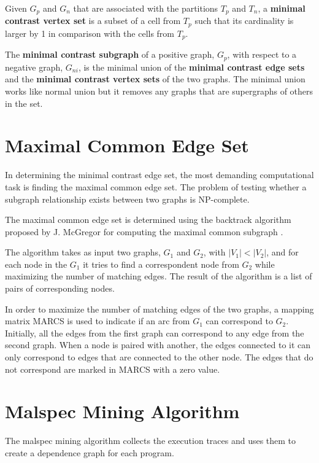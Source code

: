 Given $G_{p}$ and $G_{n}$ that are associated with the partitions $T_{p}$ and $T_{n}$, a \textbf{minimal contrast vertex set} is a subset of a cell from $T_{p}$ such that its cardinality is larger by 1 in comparison with the cells from $T_{p}$.

The \textbf{minimal contrast subgraph} of a positive graph, $G_{p}$, with respect to a negative graph, $G_{ni}$, is the minimal union of the \textbf{minimal contrast edge sets} and the \textbf{minimal contrast vertex sets} of the two graphs. The minimal union works like normal union but it removes any graphs that are supergraphs of others in the set.

\section{Maximal Common Edge Set}
\label{third:maximal-common-edge-set}

In determining the minimal contrast edge set, the most demanding computational task is finding the maximal common edge set. The problem of testing whether a subgraph relationship exists between two graphs is NP-complete.

The maximal common edge set is determined using the backtrack algorithm proposed by J. McGregor for computing the maximal common subgraph \cite{common-subgraph}. 

The algorithm takes as input two graphs, $G_{1}$ and $G_{2}$, with $|V_{1}| < |V_{2}|$, and for each node in the $G_{1}$ it tries to find a correspondent node from $G_{2}$ while maximizing the number of matching edges. The result of the algorithm is a list of pairs of corresponding nodes.

In order to maximize the number of matching edges of the two graphs, a mapping matrix MARCS is used to indicate if an arc from $G_{1}$ can correspond to $G_{2}$. Initially, all the edges from the first graph can correspond to any edge from the second graph. When a node is paired with another, the edges connected to it can only correspond to edges that are connected to the other node. The edges that do not correspond are marked in MARCS with a zero value.

\section{Malspec Mining Algorithm}
\label{third:malspec-algorithm}	

The malspec mining algorithm collects the execution traces and uses them to create a dependence graph for each program.

